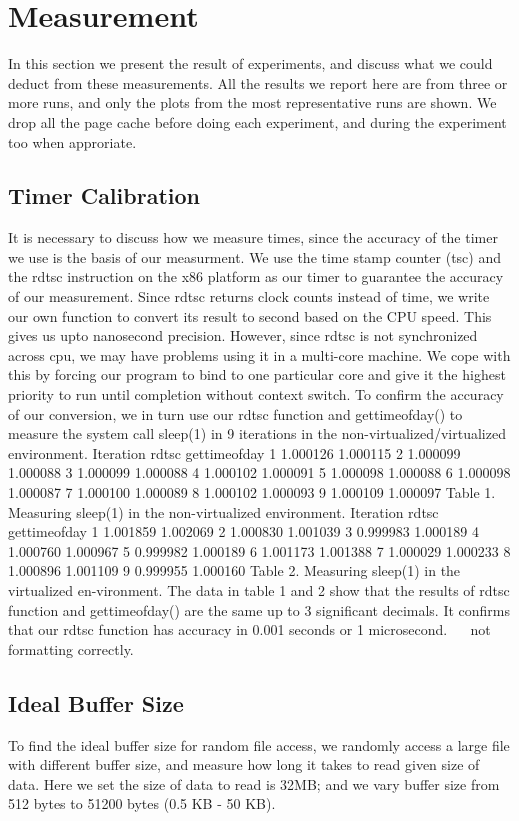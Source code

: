 \section{Measurement}
\label{section:measurement}

In this section we present the result of experiments, and discuss what we could deduct from these measurements. All the results we report here are from three or more runs, and only the plots from the most representative runs are shown. We drop all the page cache before doing each experiment, and during the experiment too when approriate.

\subsection{Timer Calibration}
It is necessary to discuss how we measure times, since the accuracy of the timer we use is the basis of our measurment. We use the time stamp counter (tsc) and the rdtsc instruction on the x86 platform as our timer to guarantee the accuracy of our measurement. Since rdtsc returns clock counts instead of time, we write our own function to convert its result to second based on the CPU speed. This gives us upto nanosecond precision. However, since rdtsc is not synchronized across cpu, we may have problems using it in a multi-core machine. We cope with this by forcing our program to bind to one particular core and give it the highest priority to run until completion without context switch. To confirm the accuracy of our conversion, we in turn use our rdtsc function and gettimeofday() to measure the system call sleep(1) in 9 iterations in the non-virtualized/virtualized environment. 
Iteration	rdtsc	gettimeofday
1	1.000126	1.000115
2	1.000099	1.000088
3	1.000099	1.000088
4	1.000102	1.000091
5	1.000098	1.000088
6	1.000098	1.000087
7	1.000100	1.000089
8	1.000102	1.000093
9	1.000109	1.000097
Table 1. Measuring sleep(1) in the non-virtualized environment.
Iteration	rdtsc	gettimeofday
1	1.001859	1.002069
2	1.000830	1.001039
3	0.999983	1.000189
4	1.000760	1.000967
5	0.999982	1.000189
6	1.001173	1.001388
7	1.000029	1.000233
8	1.000896	1.001109
9	0.999955	1.000160
Table 2. Measuring sleep(1) in the virtualized en-vironment.
The data in table 1 and 2 show that the results of rdtsc function and gettimeofday() are the same up to 3 significant decimals. It confirms that our rdtsc function has accuracy in 0.001 seconds or 1 microsecond.
  
not formatting correctly.

\subsection{Ideal Buffer Size}
To find the ideal buffer size for random file access, we randomly access a large file with different buffer size, and measure how long it takes to read given size of data. Here we set the size of data to read is 32MB; and we vary buffer size from 512 bytes to 51200 bytes (0.5 KB - 50 KB). 

